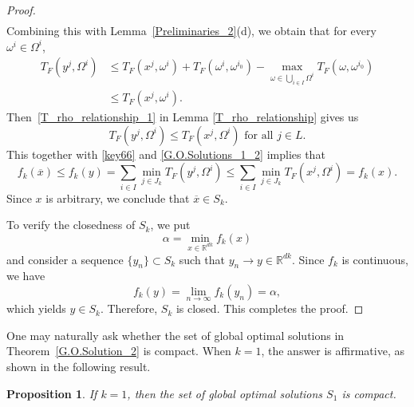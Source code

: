 \documentclass[sn-mathphys-num]{sn-jnl}%
\newtheorem{proposition}[theorem]{Proposition}
\theoremstyle{definition}
\begin{document}
\begin{proof}
\[\begin{aligned}
	\end{aligned}
	\]
	Combining this with Lemma~\ref{Preliminaries_2}(d), we obtain that
	for every \(\omega^i\in\Omega^i\),
	\[ \begin{aligned}
		T_F(y^j,\Omega^i) 	&\leq T_F(x^j,\omega^i) + T_F(\omega^i,\omega^{i_0}) - \max_{\omega \in \bigcup_{i \in I} \Omega^i} T_F(\omega,\omega^{i_0}) \\[0.1in]
		&\leq T_F(x^j,\omega^i).  
	\end{aligned}
	\]
	Then~\eqref{T_rho_relationship_1} in Lemma \ref{T_rho_relationship} gives us 
	\[
	T_F(y^j,\Omega^i) \leq T_F(x^j,\Omega^i) \text{ for all } j \in L.
	\]
	This  together with \eqref{key66} and \eqref{G.O.Solutions_1_2} implies that
	\[
	f_k(\overline x)\leq f_k(y) = \sum_{i \in I} \min_{j \in J_k} T_F(y^j,\Omega^i) \leq \sum_{i \in I} \min_{j \in J_k} T_F(x^j,\Omega^i) = f_k(x).
	\]
	Since $x$ is arbitrary, we conclude that \( \overline{x} \in S_k\).  
	
	To verify the closedness of $S_k$, we put 
	$$\alpha=\min_{x\in \mathbb{R}^{dk}}f_k(x)$$
	and consider a sequence
	$\{y_n\} \subset S_k$ such that $y_n\to y \in \mathbb{R}^{dk}$. Since $f_k$ is continuous, we have
	\[
	f_k(y)=\lim_{n\to \infty}f_k\left(y_n\right)=\alpha,
	\]
	which yields  $y \in S_k$. Therefore, $S_k$ is closed. This completes the proof.
\end{proof}


One may naturally ask whether the set of global optimal solutions in 
Theorem~\ref{G.O.Solution_2} is compact. 
When $k=1$, the answer is affirmative, as shown in the following result.


\begin{proposition}
	\label{temp_label_1}
	If $k=1$, then the set of global optimal solutions $S_1$ is compact.
\end{proposition}
\end{document}
